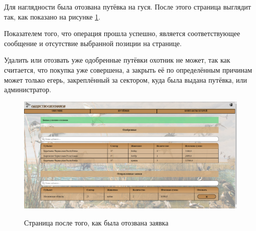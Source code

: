 	Для наглядности была отозвана путёвка на гуся. После этого страница выглядит так, как показано на рисунке \ref{fig19:image}. 
	
	Показателем того, что операция прошла успешно, является соответствующее сообщение и отсутствие выбранной позиции на странице. 
	
	Удалить или отозвать уже одобренные путёвки охотник не может, так как считается, что покупка уже совершена, а закрыть её по определённым причинам может только егерь, закреплённый за сектором, куда была выдана путёвка, или администратор.
	
	\begin{figure}[h]
		\centering
		\begin{center}
			{\includegraphics[scale=0.34]{schemes/screens/after_del_huntsman.png}}
			\caption{Страница после того, как была отозвана заявка}
			\label{fig19:image}
		\end{center}
	\end{figure}


	
	
		
		 
		
	